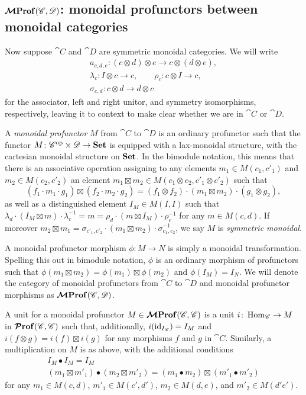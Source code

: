 \documentclass[12pt,oneside,article,draft]{memoir}
\begin{document}
\subsection{$\bm{\mathcal{M}}\mathbf{Prof}(\mathscr{C},\mathscr{D})$: monoidal profunctors between monoidal categories}

Now suppose $\cat{C}$ and $\cat{D}$ are symmetric monoidal categories.
We will write
\begin{gather*}
   a_{c,d,e}\colon (c\otimes d)\otimes e \to c\otimes(d\otimes e), \\
      \lambda_c\colon I\otimes c\to c,
      \qquad \rho_c\colon c\otimes I \to c, \\
      \sigma_{c,d}\colon c\otimes d\to d\otimes c
\end{gather*}
for the associator, left and right unitor, and symmetry isomorphisms, respectively, leaving it to context to make clear whether we are in $\cat{C}$ or $\cat{D}$.

A \emph{monoidal profunctor} $M$ from $\cat{C}$ to $\cat{D}$ is an ordinary profunctor such that the functor $M\colon {\mathscr{C}}^{\text{op}}\times\mathscr{D}\to\mathbf{Set}$ is equipped with a lax-monoidal structure, with the cartesian monoidal structure on $\mathbf{Set}$.
In the bimodule notation, this means that there is an associative operation assigning to any elements $m_1\in M(c_1,c'_1)$ and $m_2\in M(c_2,c'_2)$ an element $m_1\boxtimes m_2\in M(c_1\otimes c_2,c'_1\otimes c'_2)$ such that
\[
   (f_1\cdot m_1\cdot g_1)\boxtimes(f_2\cdot m_2\cdot g_2) = (f_1\otimes f_2)\cdot(m_1\boxtimes m_2)\cdot(g_1\otimes g_2),
\]
as well as a distinguished element $I_M\in M(I,I)$ such that $\lambda_d\cdot(I_M\boxtimes m)\cdot\lambda^{-1}_c = m = \rho_d\cdot(m\boxtimes I_M)\cdot\rho^{-1}_c$ for any $m\in M(c,d)$.
If moreover $m_2\boxtimes m_1 = \sigma_{c'_1,c'_2}\cdot(m_1\boxtimes m_2)\cdot\sigma_{c_1,c_2}^{-1}$, we say $M$ is \emph{symmetric monoidal}.

A monoidal profunctor morphism $\phi\colon M\to N$ is simply a monoidal transformation.
Spelling this out in bimodule notation, $\phi$ is an ordinary morphism of profunctors such that $\phi(m_1\boxtimes m_2)=\phi(m_1)\boxtimes\phi(m_2)$ and $\phi(I_M)=I_N$.
We will denote the category of monoidal profunctors from $\cat{C}$ to $\cat{D}$ and monoidal profunctor morphisms as $\bm{\mathcal{M}}\mathbf{Prof}(\mathscr{C},\mathscr{D})$.

A unit for a monoidal profunctor $M\in\bm{\mathcal{M}}\mathbf{Prof}(\mathscr{C},\mathscr{C})$ is a unit $i\colon\operatorname{Hom}_{\mathscr{C}}\to M$ in $\bm{\mathcal{P}}\mathbf{rof}(\mathscr{C},\mathscr{C})$ such that, additionally, $i(\operatorname{id}_{I_{\mathscr{C}}})=I_M$ and $i(f\otimes g)=i(f)\boxtimes i(g)$ for any morphisms $f$ and $g$ in $\cat{C}$.
Similarly, a multiplication on $M$ is as above, with the additional conditions
\begin{gather*}
   I_M\bullet I_M=I_M \\
   (m_1\boxtimes m'_1)\bullet(m_2\boxtimes m'_2) = (m_1\bullet m_2)\boxtimes(m'_1\bullet m'_2)
\end{gather*}
for any $m_1\in M(c,d)$, $m'_1\in M(c',d')$, $m_2\in M(d,e)$, and $m'_2\in M(d'e')$.
\end{document}
